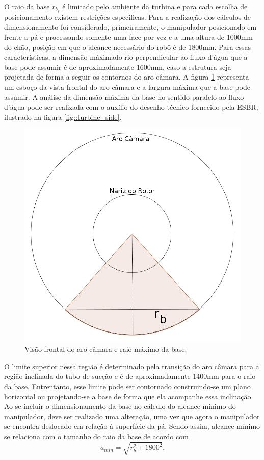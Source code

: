 O raio da base $r_{b_f}$ é limitado pelo ambiente da turbina e para cada escolha
de posicionamento existem restrições específicas. 
Para a realização dos cálculos de dimensionamento foi considerado,
primeiramente, o manipulador posicionado em frente a pá e processando somente uma face por vez
e a uma altura de 1000mm do chão, posição em que o alcance necessário do robô é
de 1800mm. Para essas características, a dimensão máximado rio perpendicular
ao fluxo d'água que a base pode assumir é de aproximadamente 1600mm, caso a
estrutura seja projetada de forma a seguir os contornos do aro câmara.
A figura \ref{fig::base_aro_frente} 
representa um esboço da vista frontal do aro câmara e a largura máxima que a
base pode assumir. A análise da dimensão máxima da base no sentido paralelo ao
fluxo d'água pode ser realizada com o auxílio do desenho técnico fornecido pela
ESBR, ilustrado na figura \ref{fig::turbine_side}.

\begin{figure}[h!]
\centering
	\includegraphics[width=0.9\columnwidth]{figs/base/base_aro_frente.jpg}
	\caption{Visão frontal do aro câmara e raio máximo da base.}
	\label{fig::base_aro_frente}
\end{figure}

O limite superior nessa
região é determinado pela transição do aro câmara para a região inclinada do
tubo de sucção e é de aproximadamente 1400mm para o raio da base. Entrentanto,
esse limite pode ser contornado construindo-se um plano horizontal ou projetando-se a base de forma que ela acompanhe essa
inclinação. Ao se incluir o dimensionamento da base no cálculo do alcance mínimo
do manipulador, deve ser realizado uma alteração, uma vez que agora o
manipulador se encontra deslocado em relação à superfície da pá. Sendo assim,
alcance mínimo se relaciona com o tamanho do raio da base de acordo com
$$a_{min}=\sqrt{r_b^2+1800^2}.$$

